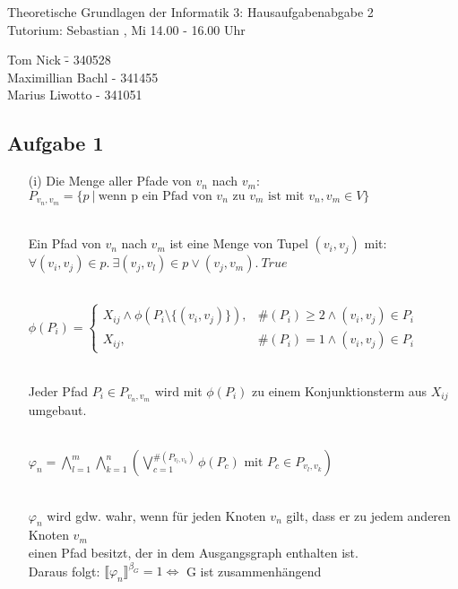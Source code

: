 \documentclass[a4paper,10pt]{article}
\author{}
\begin{document}
\begin{center}
\Large{Theoretische Grundlagen der Informatik 3: Hausaufgabenabgabe 2} \\
\large{Tutorium: Sebastian , Mi 14.00 - 16.00 Uhr}
\end{center}
\begin{tabbing}
Tom Nick \hspace{2cm}\= - 340528\\
Maximillian Bachl \> - 341455 \\
Marius Liwotto\> -  341051
\end{tabbing}
	\subsection*{Aufgabe 1}

	\begin{enumerate}
	\item[(i)]
	Die Menge aller Pfade von $v_n$ nach $v_m$:\\	
	\( P_{v_n,v_m} = \{p~|~\text{wenn p ein Pfad von $v_n$ zu $v_m$ ist mit $v_n, v_m \in V$} \}  \)
	
	\ \\Ein Pfad von $v_n$ nach $v_m$ ist eine Menge von Tupel $(v_i,v_j)$ mit:\\	
	\( \forall (v_i,v_j) \in p.~\exists (v_j,v_l) \in p \vee (v_j,v_m).~True \)
	
	\ \\ \( \phi(P_i) = \begin{cases}
	X_{ij} \wedge \phi(P_i\setminus \{(v_i,v_j)\}), & \#(P_i) \geq 2 \wedge (v_i,v_j) \in P_i \\
	X_{ij},  & \#(P_i) = 1 \wedge (v_i,v_j) \in P_i
	\end{cases} \)
	
	\ \\Jeder Pfad $P_i \in P_{v_n,v_m}$ wird mit $\phi(P_i)$ zu einem Konjunktionsterm aus $X_{ij}$ \\
	umgebaut.
		
	\ \\ \( \varphi_n = \bigwedge\limits_{l = 1}^{m} \bigwedge\limits_{k = 1}^{n} 
	(\bigvee\limits_{c = 1}^{\#(P_{v_l,v_k})} \phi(P_c) \text{ mit }P_c \in P_{v_l,v_k}) \)
		
	\ \\$\varphi_n$ wird gdw. wahr, wenn für jeden Knoten $v_n$ gilt, dass er zu jedem anderen Knoten $v_m$ \\
	einen Pfad besitzt, der in dem Ausgangsgraph enthalten ist. \\
	Daraus folgt: $\llbracket \varphi_n \rrbracket^{\beta_G} = 1 \Leftrightarrow$ G ist zusammenhängend


\end{enumerate}
\end{document}
